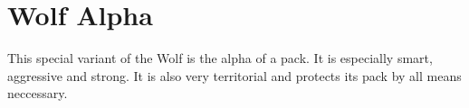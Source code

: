 \section{Wolf Alpha}

This special variant of the Wolf is the alpha of a pack. It is especially smart, aggressive and strong. It is also very territorial and protects its pack by all means neccessary.